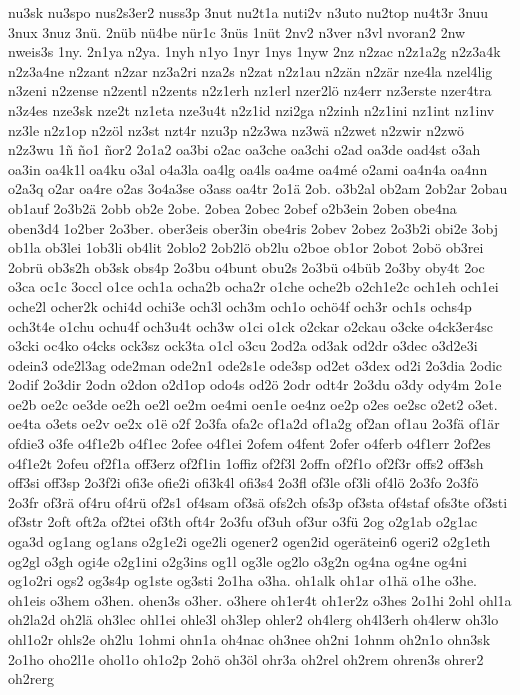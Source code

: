 {nu3sk
nu3spo
nus2s3er2
nuss3p
3nut
nu2t1a
nuti2v
n3uto
nu2top
nu4t3r
3nuu
3nux
3nuz
3nü.
2nüb
nü4be
nür1c
3nüs
1nüt
2nv2
n3ver
n3vl
nvoran2
2nw
nweis3s
1ny.
2n1ya
n2ya.
1nyh
n1yo
1nyr
1nys
1nyw
2nz
n2zac
n2z1a2g
n2z3a4k
n2z3a4ne
n2zant
n2zar
nz3a2ri
nza2s
n2zat
n2z1au
n2zän
n2zär
nze4la
nzel4lig
n3zeni
n2zense
n2zentl
n2zents
n2z1erh
nz1erl
nzer2lö
nz4err
nz3erste
nzer4tra
n3z4es
nze3sk
nze2t
nz1eta
nze3u4t
n2z1id
nzi2ga
n2zinh
n2z1ini
nz1int
nz1inv
nz3le
n2z1op
n2zöl
nz3st
nzt4r
nzu3p
n2z3wa
nz3wä
n2zwet
n2zwir
n2zwö
n2z3wu
1ñ
ño1
ñor2
2o1a2
oa3bi
o2ac
oa3che
oa3chi
o2ad
oa3de
oad4st
o3ah
oa3in
oa4k1l
oa4ku
o3al
o4a3la
oa4lg
oa4ls
oa4me
oa4mé
o2ami
oa4n4a
oa4nn
o2a3q
o2ar
oa4re
o2as
3o4a3se
o3ass
oa4tr
2o1ä
2ob.
o3b2al
ob2am
2ob2ar
2obau
ob1auf
2o3b2ä
2obb
ob2e
2obe.
2obea
2obec
2obef
o2b3ein
2oben
obe4na
oben3d4
1o2ber
2o3ber.
ober3eis
ober3in
obe4ris
2obev
2obez
2o3b2i
obi2e
3obj
ob1la
ob3lei
1ob3li
ob4lit
2oblo2
2ob2lö
ob2lu
o2boe
ob1or
2obot
2obö
ob3rei
2obrü
ob3s2h
ob3sk
obs4p
2o3bu
o4bunt
obu2s
2o3bü
o4büb
2o3by
oby4t
2oc
o3ca
oc1c
3occl
o1ce
och1a
ocha2b
ocha2r
o1che
oche2b
o2ch1e2c
och1eh
och1ei
oche2l
ocher2k
ochi4d
ochi3e
och3l
och3m
och1o
ochö4f
och3r
och1s
ochs4p
och3t4e
o1chu
ochu4f
och3u4t
och3w
o1ci
o1ck
o2ckar
o2ckau
o3cke
o4ck3er4sc
o3cki
oc4ko
o4cks
ock3sz
ock3ta
o1cl
o3cu
2od2a
od3ak
od2dr
o3dec
o3d2e3i
odein3
ode2l3ag
ode2man
ode2n1
ode2s1e
ode3sp
od2et
o3dex
od2i
2o3dia
2odic
2odif
2o3dir
2odn
o2don
o2d1op
odo4s
od2ö
2odr
odt4r
2o3du
o3dy
ody4m
2o1e
oe2b
oe2c
oe3de
oe2h
oe2l
oe2m
oe4mi
oen1e
oe4nz
oe2p
o2es
oe2sc
o2et2
o3et.
oe4ta
o3ets
oe2v
oe2x
o1ë
o2f
2o3fa
ofa2c
of1a2d
of1a2g
of2an
of1au
2o3fä
of1är
ofdie3
o3fe
o4f1e2b
o4f1ec
2ofee
o4f1ei
2ofem
o4fent
2ofer
o4ferb
o4f1err
2of2es
o4f1e2t
2ofeu
of2f1a
off3erz
of2f1in
1offiz
of2f3l
2offn
of2f1o
of2f3r
offs2
off3sh
off3si
off3sp
2o3f2i
ofi3e
ofie2i
ofi3k4l
ofi3s4
2o3fl
of3le
of3li
of4lö
2o3fo
2o3fö
2o3fr
of3rä
of4ru
of4rü
of2s1
of4sam
of3sä
ofs2ch
ofs3p
of3sta
of4staf
ofs3te
of3sti
of3str
2oft
oft2a
of2tei
of3th
oft4r
2o3fu
of3uh
of3ur
o3fü
2og
o2g1ab
o2g1ac
oga3d
og1ang
og1ans
o2g1e2i
oge2li
ogener2
ogen2id
ogerätein6
ogeri2
o2g1eth
og2gl
o3gh
ogi4e
o2g1ini
o2g3ins
og1l
og3le
og2lo
o3g2n
og4na
og4ne
og4ni
og1o2ri
ogs2
og3s4p
og1ste
og3sti
2o1ha
o3ha.
oh1alk
oh1ar
o1hä
o1he
o3he.
oh1eis
o3hem
o3hen.
ohen3s
o3her.
o3here
oh1er4t
oh1er2z
o3hes
2o1hi
2ohl
ohl1a
oh2la2d
oh2lä
oh3lec
ohl1ei
ohle3l
oh3lep
ohler2
oh4lerg
oh4l3erh
oh4lerw
oh3lo
ohl1o2r
ohls2e
oh2lu
1ohmi
ohn1a
oh4nac
oh3nee
oh2ni
1ohnm
oh2n1o
ohn3sk
2o1ho
oho2l1e
ohol1o
oh1o2p
2ohö
oh3öl
ohr3a
oh2rel
oh2rem
ohren3s
ohrer2
oh2rerg
}
